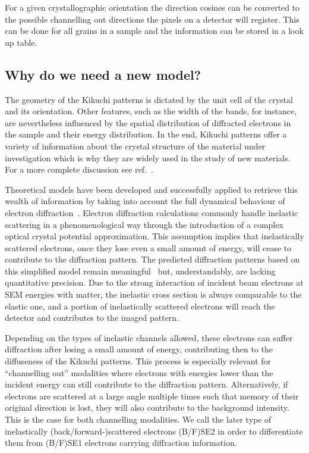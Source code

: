 \vspace{0.3cm}


For a given crystallographic orientation the direction cosines can be converted to the possible channelling out directions the pixels on a detector will register. This can be done for all grains in a sample and the information  can be stored in a look up table.






\subsection{Why do we need a new model?}
\label{sec:motivation}


The geometry of the Kikuchi patterns is dictated by the unit cell of the crystal and its orientation. Other features, such as the width of the bands, for instance, are nevertheless influenced by the spatial distribution of diffracted electrons in the sample and their energy distribution. In the end, Kikuchi patterns offer a variety of information about the crystal structure of the material under investigation which is why they are widely used in the study of new materials. For a more complete discussion see ref.~\cite{winkelmann2017}.


Theoretical models have been developed and successfully applied to retrieve this wealth of information by taking into account the full dynamical behaviour of electron diffraction~\cite{Winkelmann07, Picard14, singh2016}. Electron diffraction calculations commonly handle inelastic scattering in a phenomenological way through the introduction of a complex optical crystal potential approximation. This assumption implies that inelastically scattered electrons, once they lose even a small amount of energy, will cease to contribute to the diffraction pattern. The predicted diffraction patterns based on this simplified model remain meaningful~\cite{howie1963} but, understandably, are lacking quantitative precision. Due to the strong interaction of incident beam electrons at SEM energies with matter, the inelastic cross section is always comparable to the elastic one, and a portion of inelastically scattered electrons will reach the detector and contributes to the imaged pattern. 

Depending on the types of inelastic channels allowed, these electrons can suffer diffraction after losing a small amount of energy, contributing then to the diffuseness of the Kikuchi patterns. This process is especially relevant for ``channelling out'' modalities where electrons with energies lower than the incident energy can still contribute to the diffraction pattern. Alternatively, if electrons are scattered at a large angle multiple times such that memory of their original direction is lost, they will also contribute to the background intensity. This is the case for both channelling modalities. We call the later type of inelastically (back/forward-)scattered electrons (B/F)SE2 in order to differentiate them from (B/F)SE1 electrons carrying diffraction information.

